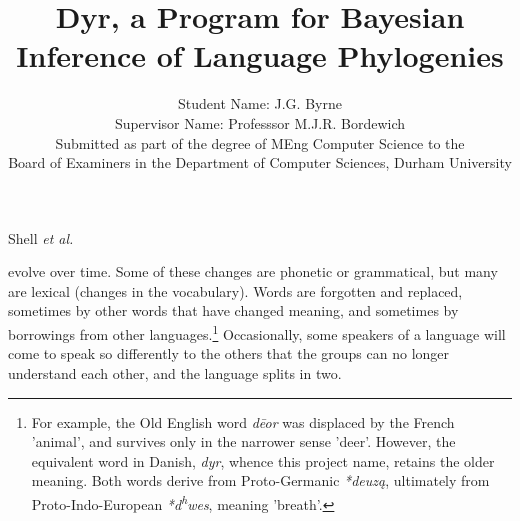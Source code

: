 \documentclass[10pt,journal,compsoc]{IEEEtran}
\newcommand{\ts}{\textsuperscript}
\begin{document}
\title{Dyr, a Program for Bayesian Inference of Language Phylogenies}

\author{Student Name: J.G. Byrne\\Supervisor Name: Professsor M.J.R. Bordewich\\
Submitted as part of the degree of MEng Computer Science to the\\
Board of Examiners in the Department of Computer Sciences, Durham University
}


%
{Shell \MakeLowercase{\textit{et al.}}}


\maketitle
\IEEEdisplaynontitleabstractindextext
\IEEEpeerreviewmaketitle


 evolve over time. Some of these changes are phonetic or grammatical, but many are lexical (changes in the vocabulary). Words are forgotten and replaced, sometimes by other words that have changed meaning, and sometimes by borrowings from other languages.\footnote{For example, the Old English word \textit{dēor} was displaced by the French 'animal', and survives only in the narrower sense 'deer'. However, the equivalent word in Danish, \textit{dyr}, whence this project name, retains the older meaning. Both words derive from Proto-Germanic \textit{*deuzą}, ultimately from Proto-Indo-European \textit{*d\ts{h}wes}, meaning 'breath'.} Occasionally, some speakers of a language will come to speak so differently to the others that the groups can no longer understand each other, and the language splits in two.
\end{document}

